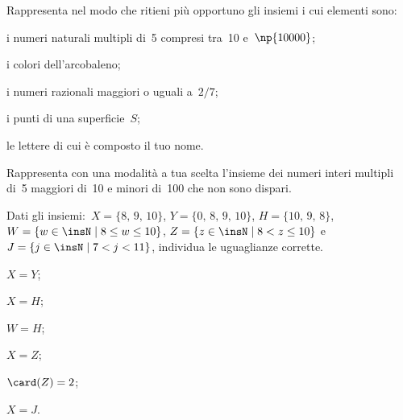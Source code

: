 \begin{esercizio}
\label{ese:6.21}
Rappresenta nel modo che ritieni più opportuno gli insiemi i cui elementi sono:
\begin{enumeratea}
\item i numeri naturali multipli di~5 compresi tra~10 e~$\np{10000}$;
\item i colori dell'arcobaleno;
\item i numeri razionali maggiori o uguali a~$2/7$;
\item i punti di una superficie~$S$;
\item le lettere di cui è composto il tuo nome.
\end{enumeratea}
\end{esercizio}

\begin{esercizio}
\label{ese:6.22}
Rappresenta con una modalità a tua scelta l'insieme dei numeri interi multipli di~5 maggiori di~10 e minori di~100 che non
sono dispari.
\end{esercizio}
\pagebreak
\begin{esercizio}
\label{ese:6.23}
Dati gli insiemi:~$X=\{\text{8, 9, 10}\}$, $Y=\{\text{0, 8, 9, 10}\}$, $H=\{\text{10, 9, 8}\}$,
$W=\{w\in\insN\mid 8\le w\le 10\}$, $Z=\{z\in\insN\mid 8<z\le 10\}$ e~$J=\{j\in\insN\mid 7<j<11\}$,
individua le uguaglianze corrette.
\begin{multicols}{3}
\begin{enumeratea}
\item $X = Y$;
\item $X= H$;
\item $W = H$;
\item $X = Z$;
\item $\card (Z)=2$;
\item $X = J$.
\end{enumeratea}
\end{multicols}
\end{esercizio}

